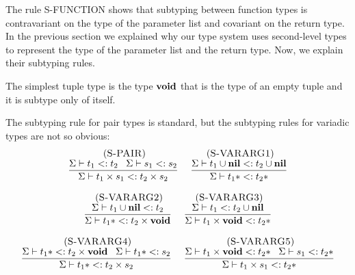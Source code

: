 The rule \textsc{S-FUNCTION} shows that subtyping between
function types is contravariant on the type of the parameter list
and covariant on the return type.
In the previous section we explained why our type system uses
second-level types to represent the type of the parameter list
and the return type.
Now, we explain their subtyping rules.

The simplest tuple type is the type $\mathbf{void}$ that is the type of an
empty tuple and it is subtype only of itself.

The subtyping rule for pair types is standard, but the subtyping rules
for variadic types are not so obvious:
\[
\begin{array}{c}
\begin{array}{c}
\; (\textsc{S-PAIR})\\
\dfrac{\Sigma \vdash t_{1} <: t_{2} \;\;\;
       \Sigma \vdash s_{1} <: s_{2}}
      {\Sigma \vdash t_{1} \times s_{1} <: t_{2} \times s_{2}}
\end{array}
\;
\begin{array}{c}
\; (\textsc{S-VARARG1})\\
\dfrac{\Sigma \vdash t_{1} \cup \mathbf{nil} <: t_{2} \cup \mathbf{nil}}
      {\Sigma \vdash t_{1}{*} <: t_{2}{*}}
\end{array}
\\ \\
\begin{array}{c}
\; (\textsc{S-VARARG2})\\
\dfrac{\Sigma \vdash t_{1} \cup \mathbf{nil} <: t_{2}}
      {\Sigma \vdash t_{1}{*} <: t_{2} \times \mathbf{void}}
\end{array}
\;
\begin{array}{c}
\; (\textsc{S-VARARG3})\\
\dfrac{\Sigma \vdash t_{1} <: t_{2} \cup \mathbf{nil}}
      {\Sigma \vdash t_{1} \times \mathbf{void} <: t_{2}{*}}
\end{array}
\\ \\
\begin{array}{c}
\; (\textsc{S-VARARG4})\\
\dfrac{\Sigma \vdash t_{1}{*} <: t_{2} \times \mathbf{void} \;\;\;
       \Sigma \vdash t_{1}{*} <: s_{2}}
      {\Sigma \vdash t_{1}{*} <: t_{2} \times s_{2}}
\end{array}
\;
\begin{array}{c}
\; (\textsc{S-VARARG5})\\
\dfrac{\Sigma \vdash t_{1} \times \mathbf{void} <: t_{2}{*} \;\;\;
       \Sigma \vdash s_{1} <: t_{2}{*}}
      {\Sigma \vdash t_{1} \times s_{1} <: t_{2}{*}}
\end{array}
\end{array}
\]

